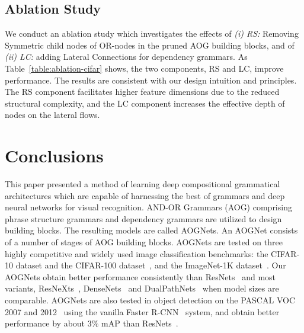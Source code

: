 \documentclass[10pt,twocolumn,letterpaper]{article}
\begin{document}
\subsection{Ablation Study}
We conduct an ablation study which investigates the effects of \emph{(i) RS:} Removing Symmetric child nodes of OR-nodes in the pruned AOG building blocks, and of \emph{(ii) LC:} adding Lateral Connections for dependency grammars. As Table~\ref{table:ablation-cifar} shows, the two components, RS and LC, improve performance. The results are consistent with our design intuition and principles. The RS component facilitates higher feature dimensions due to the reduced structural complexity, and the LC component increases the effective depth of nodes on the lateral flows.   
 
\section{Conclusions} \label{sec:conclusion}
This paper presented a method of learning deep compositional grammatical architectures which are capable of harnessing the best of grammars and deep neural networks for visual recognition. AND-OR Grammars (AOG) comprising phrase structure grammars and dependency grammars are utilized to design building blocks. The resulting models are called AOGNets. An AOGNet consists of a number of stages of AOG building blocks. AOGNets are tested on three highly competitive and widely used image classification  benchmarks: the CIFAR-10 dataset and the CIFAR-100 dataset~\cite{CIFAR},  and the ImageNet-1K dataset~\cite{ImageNet}. Our AOGNets obtain better performance consistently than  ResNets~\cite{ResidualNet} and most variants, ResNeXts~\cite{ResNeXt}, DenseNets~\cite{DenseNet} and DualPathNets~\cite{DPN} when model sizes are comparable. AOGNets are also tested in object detection on the PASCAL VOC 2007 and 2012~\cite{VOC} using the vanilla Faster R-CNN~\cite{FasterRCNN} system, and obtain better performance by about $3\%$ mAP than ResNets~\cite{ResidualNet}.  

\end{document}
